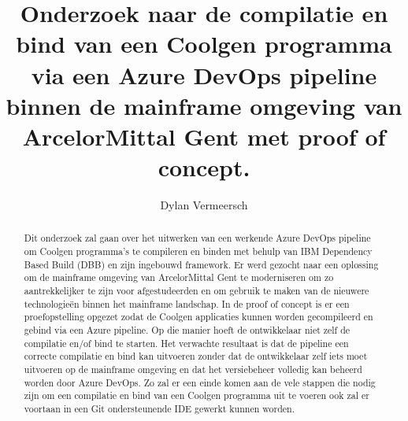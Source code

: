 \documentclass[a0,portrait]{hogent-poster}
\title{Onderzoek naar de compilatie en bind van een Coolgen programma via een Azure DevOps pipeline binnen de mainframe omgeving van ArcelorMittal Gent met proof of concept.}
\author{Dylan Vermeersch}
\begin{document}
\maketitle

\begin{abstract}
Dit onderzoek zal gaan over het uitwerken van een werkende Azure DevOps pipeline om Coolgen programma's te compileren en binden met behulp van IBM Dependency Based Build (DBB) en zijn ingebouwd framework. Er werd gezocht naar een oplossing om de mainframe omgeving van ArcelorMittal Gent te moderniseren om zo aantrekkelijker te zijn voor afgestudeerden en om gebruik te maken van de nieuwere technologieën binnen het mainframe landschap. In de proof of concept is er een proefopstelling opgezet zodat de Coolgen applicaties kunnen worden gecompileerd en gebind via een Azure pipeline. Op die manier hoeft de ontwikkelaar niet zelf de compilatie en/of bind te starten. Het verwachte resultaat is dat de pipeline een correcte compilatie en bind kan uitvoeren zonder dat de ontwikkelaar zelf iets moet uitvoeren op de mainframe omgeving en dat het versiebeheer volledig kan beheerd worden door Azure DevOps. Zo zal er een einde komen aan de vele stappen die nodig zijn om een compilatie en bind van een Coolgen programma uit te voeren ook zal er voortaan in een Git ondersteunende IDE gewerkt kunnen worden.
\end{abstract}
\end{document}
